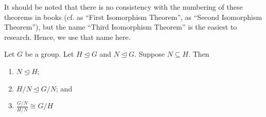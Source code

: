 It should be noted that there is no consistency with the numbering of these theorems in books (cf. {\cite[\S 68]{clark_1984}} as ``First Isomorphism Theorem'', {\cite[Theorem 8.16]{humphreys_1996}} as ``Second Isomorphism Theorem''), but the name ``Third Isomorphism Theorem'' is the easiest to research. Hence, we use that name here.

\begin{theorem}\label{thrm-isomorphism-3}
    Let $G$ be a group. Let $H \unlhd G$ and $N \unlhd G$. Suppose $N \subseteq H$. Then
    \begin{enumerate}
        \item $N \unlhd H$;
        \item $H/N \unlhd G/N$; and
        \item $\frac{G/N}{H/N} \cong G/H$
    \end{enumerate}
\end{theorem}
